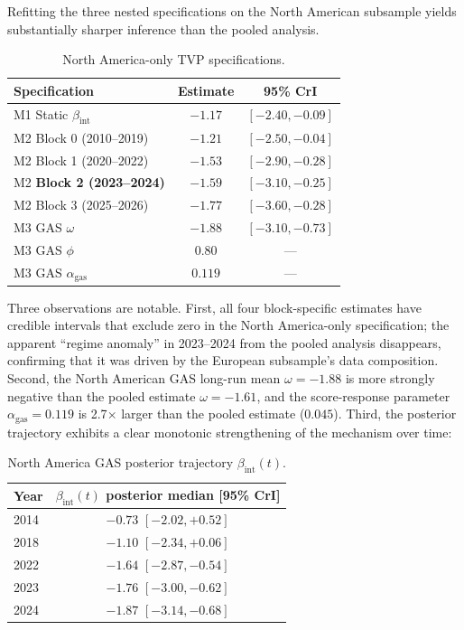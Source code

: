 \documentclass[11pt,a4paper]{article}
\newcommand{\bint}{\beta_{\mathrm{int}}}
\begin{document}
Refitting the three nested specifications on the North American subsample yields substantially sharper inference than the pooled analysis.

\begin{table}[h!]
\centering
\caption{North America-only TVP specifications.}
\begin{tabular}{lcc}
\toprule
Specification & Estimate & 95\% CrI \\
\midrule
M1 Static $\bint$ & $-1.17$ & $[-2.40, -0.09]$ \\
M2 Block 0 (2010--2019) & $-1.21$ & $[-2.50, -0.04]$ \\
M2 Block 1 (2020--2022) & $-1.53$ & $[-2.90, -0.28]$ \\
M2 \textbf{Block 2 (2023--2024)} & $\mathbf{-1.59}$ & $\mathbf{[-3.10, -0.25]}$ \\
M2 Block 3 (2025--2026) & $-1.77$ & $[-3.60, -0.28]$ \\
M3 GAS $\omega$ & $-1.88$ & $[-3.10, -0.73]$ \\
M3 GAS $\phi$ & $0.80$ & --- \\
M3 GAS $\alpha_{\mathrm{gas}}$ & $0.119$ & --- \\
\bottomrule
\end{tabular}
\label{tab:ch7-na-tvp}
\end{table}

Three observations are notable. First, all four block-specific estimates have credible intervals that exclude zero in the North America-only specification; the apparent ``regime anomaly'' in 2023--2024 from the pooled analysis disappears, confirming that it was driven by the European subsample's data composition. Second, the North American GAS long-run mean $\omega = -1.88$ is more strongly negative than the pooled estimate $\omega = -1.61$, and the score-response parameter $\alpha_{\mathrm{gas}} = 0.119$ is 2.7$\times$ larger than the pooled estimate ($0.045$). Third, the posterior trajectory exhibits a clear monotonic strengthening of the mechanism over time:

\begin{table}[h!]
\centering
\caption{North America GAS posterior trajectory $\bint(t)$.}
\begin{tabular}{lc}
\toprule
Year & $\bint(t)$ posterior median [95\% CrI] \\
\midrule
2014 & $-0.73$ $[-2.02, +0.52]$ \\
2018 & $-1.10$ $[-2.34, +0.06]$ \\
2022 & $-1.64$ $[-2.87, -0.54]$ \\
2023 & $-1.76$ $[-3.00, -0.62]$ \\
2024 & $\mathbf{-1.87}$ $[-3.14, -0.68]$ \\
\bottomrule
\end{tabular}
\label{tab:ch7-na-gas}
\end{table}
\end{document}
